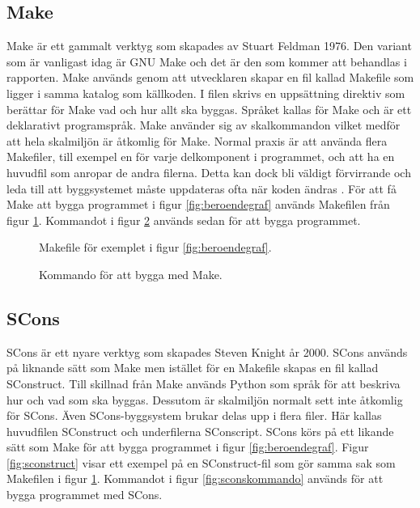 \subsection{Make}
Make är ett gammalt verktyg som skapades av Stuart Feldman 1976. Den variant som är vanligast idag är GNU Make och det är den som kommer att behandlas i rapporten.
\newline
\newline
Make används genom att utvecklaren skapar en fil kallad Makefile som ligger i samma katalog som källkoden. I filen skrivs en uppsättning direktiv som berättar för Make vad och hur allt ska byggas. Språket kallas för Make och är ett deklarativt programspråk. Make använder sig av skalkommandon vilket medför att hela skalmiljön är åtkomlig för Make.
\newline
\newline
Normal praxis är att använda flera Makefiler, till exempel en för varje delkomponent i programmet, och att ha en huvudfil som anropar de andra filerna. Detta kan dock bli väldigt förvirrande och leda till att byggsystemet måste uppdateras ofta när koden ändras \citep{recursivemake}.
\newline
\newline
För att få Make att bygga programmet i figur \ref{fig:beroendegraf} används Makefilen från figur \ref{fig:makefile}. Kommandot i figur \ref{fig:makekommando} används sedan för att bygga programmet.

\begin{figure}[h!]
  
  \caption{Makefile för exemplet i figur \ref{fig:beroendegraf}.}
  \label{fig:makefile}
\end{figure}

\begin{figure}[h!]
  
  \caption{Kommando för att bygga med Make.}
  \label{fig:makekommando}
\end{figure}

\subsection{SCons}
SCons är ett nyare verktyg som skapades Steven Knight år 2000. SCons används på liknande sätt som Make men istället för en Makefile skapas en fil kallad SConstruct. Till skillnad från Make används Python som språk för att beskriva hur och vad som ska byggas. Dessutom är skalmiljön normalt sett inte åtkomlig för SCons.
\newline
\newline
Även SCons-byggsystem brukar delas upp i flera filer. Här kallas huvudfilen SConstruct och underfilerna SConscript.
\newline
\newline
SCons körs på ett likande sätt som Make för att bygga programmet i figur \ref{fig:beroendegraf}. Figur \ref{fig:sconstruct} visar ett exempel på en SConstruct-fil som gör samma sak som Makefilen i figur \ref{fig:makefile}. Kommandot i figur \ref{fig:sconskommando} används för att bygga programmet med SCons.


